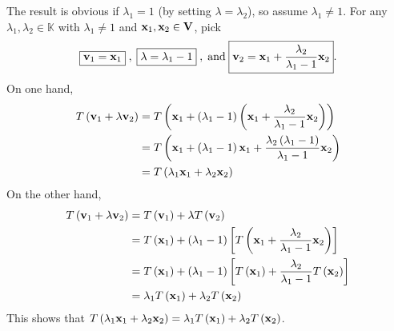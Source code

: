 \begin{solution}
    The result is obvious if \( \lambda_{1} = 1 \) (by setting \( \lambda = \lambda_{2} \)), so assume \( \lambda_{1} \neq 1 \). For any \( \lambda_{1}, \lambda_{2} \in \mathbb{K} \) with \( \lambda_{1} \neq 1 \) and \( \vb{x}_{1}, \vb{x}_{2} \in \mathbf{V} \), pick 
    \[ \boxed{\vb{v}_{1} = \vb{x}_{1}} \; ,  \;  \boxed{\lambda = \lambda_{1} -1} \; , \;  \text{and} \; \boxed{ \vb{v}_{2} = \vb{x}_{1} + \frac{\lambda_{2}}{\lambda_{1}-1} \vb{x}_{2}}  .\] 
    On one hand, 
    \begin{align*}
        T \left( \vb{v}_{1} + \lambda \vb{v}_{2} \right) &= T \left( \vb{x}_{1} + \left( \lambda_{1} -1 \right)  \left( \vb{x}_{1} + \frac{\lambda_{2}}{\lambda_{1}-1} \vb{x}_{2} \right)\right)\\
        &= T \left(  \vb{x}_{1} + \left( \lambda_{1}-1 \right)  \vb{x}_{1} + \frac{\lambda_{2} \left( \lambda_{1}-1 \right)}{\lambda_{1}-1} \vb{x}_{2} \right) \\
        &= T \left( \lambda_{1} \vb{x}_{1} + \lambda_{2} \vb{x}_{2} \right)
    \end{align*}
    On the other hand, 
    \begin{align*}
         T \left( \vb{v}_{1} + \lambda \vb{v}_{2} \right) &= T \left( \vb{v}_{1} \right) + \lambda T \left( \vb{v}_{2} \right) \\
         &= T \left( \vb{x}_{1} \right) + \left( \lambda_{1} -1 \right) \left[ T \left( \vb{x}_{1} + \frac{\lambda_{2}}{\lambda_{1}-1} \vb{x}_{2} \right) \right] \\
         &= T \left( \vb{x}_{1} \right) + \left( \lambda_{1} -1 \right) \left[ T \left( \vb{x}_{1} \right) + \frac{\lambda_{2}}{\lambda_{1}-1} T \left( \vb{x}_{2} \right) \right] \\
         &= \lambda_{1} T \left( \vb{x}_{1} \right) + \lambda_{2} T \left( \vb{x}_{2} \right)
    \end{align*}
    This shows that \(T \left( \lambda_{1} \vb{x}_{1} + \lambda_{2} \vb{x}_{2} \right) = \lambda_{1} T \left( \vb{x}_{1} \right) + \lambda_{2} T \left( \vb{x}_{2} \right)\).
\end{solution}


